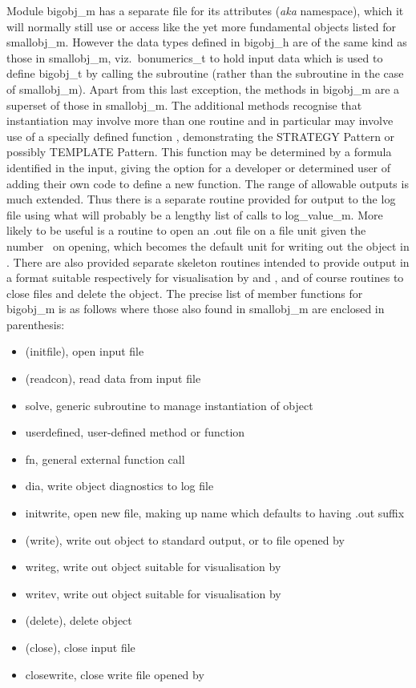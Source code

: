 Module bigobj\_m has a separate file for its attributes (\emph{aka} namespace), which it will
normally still use or access
like the yet more fundamental objects listed for smallobj\_m. However the data types
defined in bigobj\_h are of the same kind as those in smallobj\_m, viz.\ bonumerics\_t
to hold input data which is used to define bigobj\_t by calling the  subroutine
(rather than the subroutine  in the case of smallobj\_m). Apart from
this last  exception, the methods in bigobj\_m are a superset of those in smallobj\_m.
The additional methods recognise that instantiation may involve
more than one routine and in particular may involve use of a specially defined
function , demonstrating the STRATEGY Pattern or possibly TEMPLATE Pattern.
This function may be determined by a formula identified in the input,
giving  the option for a developer or determined user of adding their own code to define
a new function. The range of allowable outputs is much extended. Thus there
is a separate routine provided for output to the log file using what will
probably be a lengthy list of calls to log\_value\_m. More likely to be useful  is a routine
to open an .out file on a file unit given the number~ on opening, which
becomes the default unit for writing out the object in .
There are also provided separate skeleton routines intended to provide output
in a format suitable respectively for visualisation by  and ,
and of course routines to close files and delete the object.
The precise list of member functions for bigobj\_m is as follows
where those also found in smallobj\_m are enclosed in parenthesis:
\begin{itemize}
\item (initfile),  open input file
\item (readcon),  read data from input file
\item solve,  generic subroutine to manage instantiation of object
\item userdefined,  user-defined method or function
\item fn, general external function call
\item dia, write object diagnostics to log file
\item initwrite, open new file, making up name which defaults to having .out suffix
\item (write), write out object to standard output, or to file opened by 
\item writeg, write out object suitable for  visualisation by 
\item writev, write out object suitable for  visualisation by  
\item (delete), delete object
\item (close), close input file
\item closewrite,  close write file opened by 
\end{itemize}

